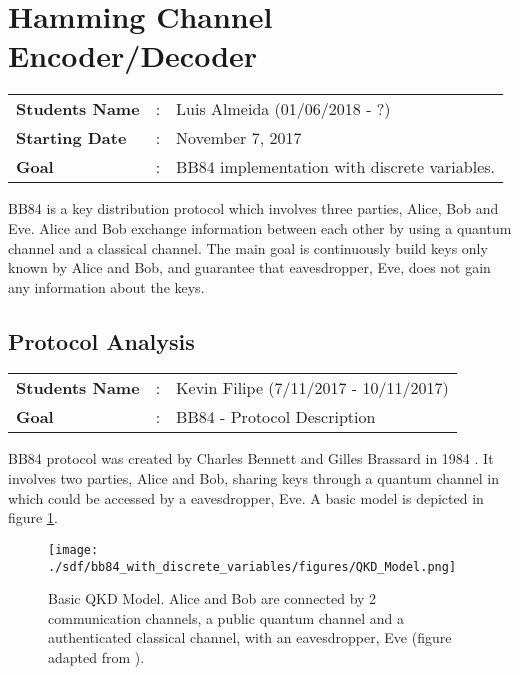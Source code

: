 \clearpage
\section{Hamming Channel Encoder/Decoder}

\begin{refsection}

\begin{tcolorbox}	
\begin{tabular}{p{2.75cm} p{0.2cm} p{10.5cm}} 	
\textbf{Students Name}  &:& Luis Almeida (01/06/2018 - ?) \\
\textbf{Starting Date} &:& November 7, 2017\\
\textbf{Goal}          &:& BB84 implementation with discrete variables.
\end{tabular}
\end{tcolorbox}

BB84 is a key distribution protocol which involves three parties, Alice, Bob and Eve. Alice and Bob exchange information between each other by using a quantum channel and a classical channel. The main goal is continuously build keys only known by Alice and Bob, and guarantee that eavesdropper, Eve, does not gain any information about the keys.


\subsection{Protocol Analysis}
\begin{tcolorbox}	
	\begin{tabular}{p{2.75cm} p{0.2cm} p{10.5cm}} 	
		\textbf{Students Name}  &:& Kevin Filipe (7/11/2017 - 10/11/2017)\\
		\textbf{Goal}          &:& BB84 - Protocol Description
	\end{tabular}
\end{tcolorbox}

BB84 protocol was created by Charles Bennett and Gilles Brassard in 1984 \cite{Bennet84}. It involves two parties, Alice and Bob, sharing keys through a quantum channel in which could be accessed by a eavesdropper, Eve. A basic model is depicted in figure \ref{fig:qkd model}.

\begin{figure}[H]
	\centering
	\texttt{[image: ./sdf/bb84\_with\_discrete\_variables/figures/QKD\_Model.png]}
	\caption{Basic QKD Model. Alice and Bob are connected by 2 communication channels, a public quantum channel and a authenticated classical channel, with an eavesdropper, Eve (figure adapted from \cite{Gerry05}).}\label{fig:qkd model}
\end{figure}


\end{refsection}
